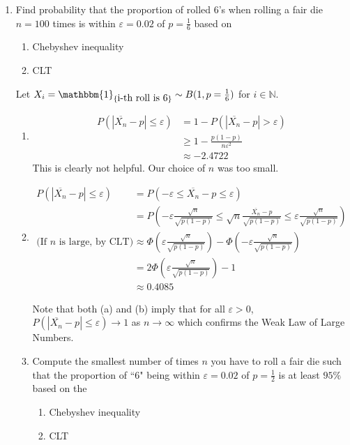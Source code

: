 \documentclass{article}
\newcommand{\N}{\mathbb{N}}
\begin{document}
			\newpage
			\begin{myex}{}{}
				\begin{enumerate}
					\item Find probability that the proportion of rolled 6's when rolling a fair die $n=100$ times is within $\varepsilon=0.02$ of $p=\frac{1}{6}$ based on
					\begin{enumerate}[label=(\alph*)]
						\item Chebyshev inequality
						\item CLT
					\end{enumerate}
					
					Let $X_i=\mathbbm{1}_{\{\mbox{i-th roll is 6}\}}\sim B(1, p=\frac{1}{6})$ for $i\in\N$.
					\begin{enumerate}[label=(\alph*)]
						\item
						\begin{align*}
							P(|\overline{X_n}-p|\leq\varepsilon)&=1-P(|\overline{X_n}-p|>\varepsilon)\\
							&\geq1-\frac{p(1-p)}{n\varepsilon^2}\\
							&\approx-2.4722
						\end{align*}
						This is clearly not helpful. Our choice of $n$ was too small.
						\item
						\begin{align*}
							P(|\overline{X_n}-p|\leq\varepsilon)&=P(-\varepsilon\leq\overline{X_n}-p\leq\varepsilon)\\
							&=P(-\varepsilon\frac{\sqrt{n}}{\sqrt{p(1-p)}}\leq\sqrt{n}\frac{\overline{X_n}-p}{\sqrt{p(1-p)}}\leq\varepsilon\frac{\sqrt{n}}{\sqrt{p(1-p)}})\\
							\mbox{(If $n$ is large, by CLT) }&\approx\Phi(\varepsilon\frac{\sqrt{n}}{\sqrt{p(1-p)}})-\Phi(-\varepsilon\frac{\sqrt{n}}{\sqrt{p(1-p)}})\\
							&=2\Phi(\varepsilon\frac{\sqrt{n}}{\sqrt{p(1-p)}})-1\\
							&\approx0.4085
						\end{align*}
						
						Note that both (a) and (b) imply that for all $\varepsilon>0$, $P(|\overline{X_n}-p|\leq\varepsilon)\to1$ as $n\to\infty$ which confirms the Weak Law of Large Numbers.
						
						\item Compute the smallest number of times $n$ you have to roll a fair die such that the proportion of ``6" being within $\varepsilon=0.02$ of $p=\frac{1}{2}$ is at least $95\%$ based on the
						\begin{enumerate}[label=(\alph*)]
							\item Chebyshev inequality
							\item CLT
						\end{enumerate}
						

\end{enumerate}
\end{enumerate}
\end{myex}
\end{document}
